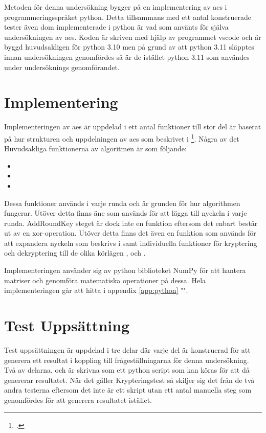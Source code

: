 Metoden för denna undersökning bygger på en implementering av \acrshort{aes} i programmeringsspråket
\gls{python}. Detta tillsammans med ett antal konstruerade tester även dom implementerade i
\gls{python} är vad som använts för själva undersökningen av \acrshort{aes}. Koden
är skriven med hjälp av programmet \gls{vscode} och är byggd huvudsakligen för \gls{python} 3.10 men
på grund av att \gls{python} 3.11 släpptes innan undersökningen genomfördes så är de istället \gls{python} 3.11
som användes under undersöknings genomförandet.

\section{Implementering} %
Implementeringen av \acrshort{aes} är uppdelad i ett antal funktioner till stor del är baserat på
hur strukturen och uppdelningen av \acrshort{aes} som beskrivet i \footcite{daemen1999aes}.
Några av det Huvudsakliga funktionerna av algoritmen är som följande:
\begin{itemize}
    \item \texttt{}
    \item \texttt{}
    \item \texttt{}
\end{itemize}

Dessa funktioner används i varje runda och är grunden för hur algorithmen fungerar. Utöver detta finns
äne  som används för att lägga till nyckeln i varje runda. AddRoundKey steget är dock inte
en funktion eftersom det enbart består ut av en \gls{xor}-operation. Utöver detta finns det även
en funktion som används för att expandera nyckeln som beskrivs i  samt
individuella funktioner för kryptering och dekryptering till de olika körlägen ,  och
.

Implementeringen använder sig av \gls{python} biblioteket NumPy för att hantera matriser och genomföra
matematiska operationer på dessa. Hela implementeringen går att hitta i appendix \ref{app:python} "".

\section{Test Uppsättning} %
Test uppsättningen är uppdelad i tre delar där varje del är konstruerad för att generera ett
resultat i koppling till frågeställningarna för denna undersökning. Två av delarna,  och
 är skrivna som ett \gls{python} script som kan köras för att då genererar
resultatet. När det gäller Krypteringstest så skiljer sig det från de två andra testerna eftersom det
inte är ett skript utan ett antal manuella steg som genomfördes för att generera resultatet istället.

